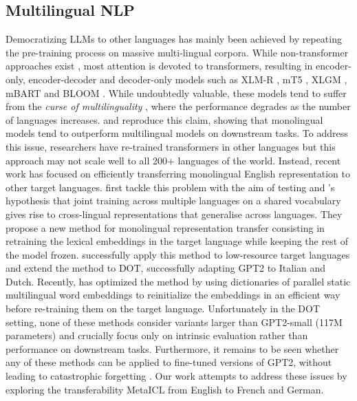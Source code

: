 \documentclass[11pt]{article}
\begin{document}
\subsection{Multilingual NLP}

Democratizing LLMs to other languages has mainly been achieved by repeating the pre-training process
on massive multi-lingual corpora. While non-transformer approaches exist
\citep{artetxe_massively_2019}, most attention is devoted to transformers, resulting in
encoder-only, encoder-decoder and decoder-only models such as XLM-R
\citep{conneau_cross-lingual_2019}, mT5 \citep{xue_mt5_2021}, XLGM \citep{lin_few-shot_2021}, mBART
\citep{liu_multilingual_2020} and BLOOM \citep{bigscience_workshop_bloom_2022}. While undoubtedly
valuable, these models tend to suffer from the \textit{curse of multilinguality}
\citep{conneau_unsupervised_2020}, where the performance degrades as the number of languages
increases. \citet{nozza_what_2020} and \citet{wu_are_2020} reproduce this claim, showing that
monolingual models tend to outperform multilingual models on downstream tasks. To address this
issue, researchers have re-trained transformers in other languages
\citep{martin_camembert_2020,de_vries_bertje_2019,chan_germans_2020, de_mattei_geppetto_2020} but
this approach may not scale well to all 200+ languages of the world. Instead, recent work has
focused on efficiently transferring monolingual English representation to other target languages.
\citet{artetxe_cross-lingual_2020} first tackle this problem with the aim of testing
\citet{pires_how_2019} and \citet{cao_multilingual_2022}'s hypothesis that joint training across
multiple languages on a shared vocabulary gives rise to cross-lingual representations that
generalise across languages. They propose a new method for monolingual representation transfer
consisting in retraining the lexical embeddings in the target language while keeping the rest of the
model frozen. \citet{de_vries_adapting_2021} successfully apply this method to low-resource target
languages and \citet{de_vries_as_2021} extend the method to DOT, successfully adapting GPT2 to
Italian and Dutch. Recently, \citet{minixhofer_wechsel_2022} has optimized the method by using
dictionaries of parallel static multilingual word embeddings to reinitialize the embeddings in an
efficient way before re-training them on the target language. Unfortunately in the DOT setting, none
of these methods consider variants larger than GPT2-small (117M parameters) and crucially focus only
on intrinsic evaluation rather than performance on downstream tasks. Furthermore, it remains to be
seen whether any of these methods can be applied to fine-tuned versions of GPT2, without leading to
catastrophic forgetting \citep{mccloskey_catastrophic_1989}. Our work attempts to address these
issues by exploring the transferability MetaICL \citep{min_metaicl_2022} from English to French and
German.
\end{document}
